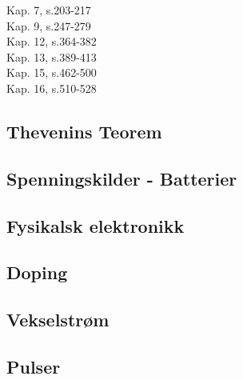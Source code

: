 Kap.  7, s.203-217 \\
Kap.  9, s.247-279 \\
Kap. 12, s.364-382 \\
Kap. 13, s.389-413 \\
Kap. 15, s.462-500 \\
Kap. 16, s.510-528

\subsection{Thevenins Teorem}


\subsection{Spenningskilder - Batterier}


\subsection{Fysikalsk elektronikk}


\subsection{Doping}


\subsection{Vekselstrøm}


\subsection{Pulser}

